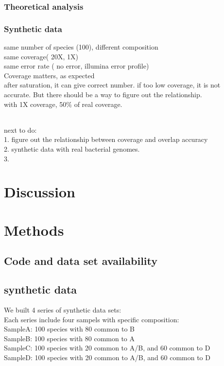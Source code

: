 \documentclass[10pt]{article}
\begin{document}
\subsubsection*{Theoretical analysis}
\subsubsection*{Synthetic data}
same number of species (100), different composition
\\
same coverage( 20X, 1X)
\\
same error rate ( no error, illumina error profile)
\\
Coverage matters, as expected
\\
after saturation, it can give correct number. if too low coverage, it is not accurate.
But there should be a way to figure out the relationship.
\\
with 1X coverage, 50\% of real coverage.

\\next to do:
\\
1. figure out the relationship between coverage and overlap accuracy
\\
2. synthetic data with real bacterial genomes.
\\
3. 

\section*{Discussion}




\section*{Methods}

\subsection*{Code and data set availability}

\subsection*{synthetic data}
We built 4 series of synthetic data sets:\\
Each series include four sampels with specific composition:\\
SampleA: 100 species with 80 common to B\\
SampleB: 100 species with 80 common to A\\
SampleC: 100 species with 20 common to A/B, and 60 common to D\\
SampleD: 100 species with 20 common to A/B, and 60 common to D\\
\end{document}
